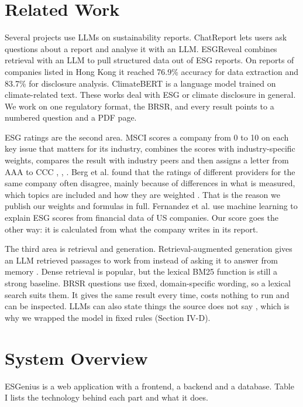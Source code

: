 \documentclass[conference]{IEEEtran}
\begin{document}
\section{Related Work}
Several projects use LLMs on sustainability reports. ChatReport \cite{b7} lets users ask questions about a report and analyse it with an LLM. ESGReveal \cite{b6} combines retrieval with an LLM to pull structured data out of ESG reports. On reports of companies listed in Hong Kong it reached 76.9\% accuracy for data extraction and 83.7\% for disclosure analysis. ClimateBERT \cite{b10} is a language model trained on climate-related text. These works deal with ESG or climate disclosure in general. We work on one regulatory format, the BRSR, and every result points to a numbered question and a PDF page.

ESG ratings are the second area. MSCI scores a company from 0 to 10 on each key issue that matters for its industry, combines the scores with industry-specific weights, compares the result with industry peers and then assigns a letter from AAA to CCC \cite{b2}, \cite{b3}, \cite{b4}. Berg et al. found that the ratings of different providers for the same company often disagree, mainly because of differences in what is measured, which topics are included and how they are weighted \cite{b5}. That is the reason we publish our weights and formulas in full. Fernandez et al. \cite{b8} use machine learning to explain ESG scores from financial data of US companies. Our score goes the other way: it is calculated from what the company writes in its report.

The third area is retrieval and generation. Retrieval-augmented generation gives an LLM retrieved passages to work from instead of asking it to answer from memory \cite{b9}. Dense retrieval is popular, but the lexical BM25 function \cite{b11} is still a strong baseline. BRSR questions use fixed, domain-specific wording, so a lexical search suits them. It gives the same result every time, costs nothing to run and can be inspected. LLMs can also state things the source does not say \cite{b12}, which is why we wrapped the model in fixed rules (Section IV-D).

\section{System Overview}
ESGenius is a web application with a frontend, a backend and a database. Table I lists the technology behind each part and what it does.
\end{document}
